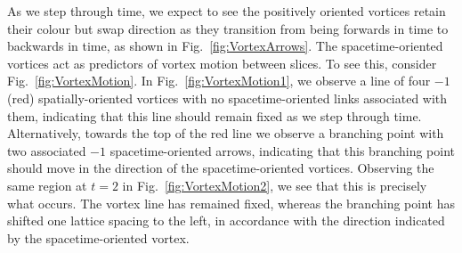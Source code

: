 As we step through time, we expect to see the positively oriented vortices retain their colour but swap direction as they transition from being forwards in time to backwards in time, as shown in Fig.~\ref{fig:VortexArrows}. The spacetime-oriented vortices act as predictors of vortex motion between slices. To see this, consider Fig.~\ref{fig:VortexMotion}. In Fig.~\ref{fig:VortexMotion1}, we observe a line of four $-1$ (red) spatially-oriented vortices with no spacetime-oriented links associated with them, indicating that this line should remain fixed as we step through time. Alternatively, towards the top of the red line we observe a branching point with two associated $-1$ spacetime-oriented arrows, indicating that this branching point should move in the direction of the spacetime-oriented vortices. Observing the same region at $t=2$ in Fig.~\ref{fig:VortexMotion2}, we see that this is precisely what occurs. The vortex line has remained fixed, whereas the branching point has shifted one lattice spacing to the left, in accordance with the direction indicated by the spacetime-oriented vortex.\\
%
